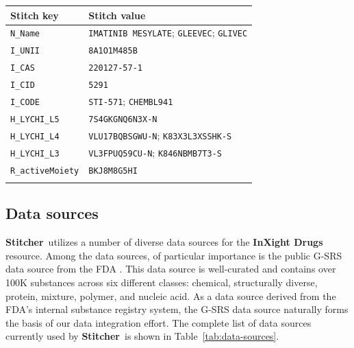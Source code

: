 \documentclass{bioinfo}
\newcommand\st{\textbf{Stitcher}}
\newcommand\ix{\textbf{InXight Drugs}}
\begin{document}
\begin{table}[thb]
{\begin{tabular}{@{}ll@{}}\toprule Stitch key &
Stitch value\\\midrule
\texttt{N\_Name} & \texttt{IMATINIB MESYLATE}; \texttt{GLEEVEC}; \texttt{GLIVEC}\\
\texttt{I\_UNII} & \texttt{8A1O1M485B}\\
\texttt{I\_CAS} & \texttt{220127-57-1}\\
\texttt{I\_CID} & \texttt{5291}\\
\texttt{I\_CODE} & \texttt{STI-571}; \texttt{CHEMBL941}\\
\texttt{H\_LYCHI\_L5} & \texttt{7S4GKGNQ6N3X-N}\\
\texttt{H\_LYCHI\_L4} & \texttt{VLU17BQBSGWU-N}; \texttt{K83X3L3XSSHK-S}\\
\texttt{H\_LYCHI\_L3} & \texttt{VL3FPUQ59CU-N}; \texttt{K846NBMB7T3-S}\\
\texttt{R\_activeMoiety} & \texttt{BKJ8M8G5HI}\\\botrule
\end{tabular}}{}
\end{table}

\subsection{Data sources}
\st\ utilizes a number of diverse data sources for the \ix{} resource.
Among the data sources, of particular importance is the public G-SRS
data source from the FDA \citep{GSRSData}. This data source is
well-curated and contains over 100K substances across six different
classes: chemical, structurally diverse, protein, mixture, polymer,
and nucleic acid. As a data source derived from the FDA's internal
substance registry system, the G-SRS data source naturally forms the
basis of our data integration effort. The complete list of data
sources currently used by \st\ is shown in
Table~\ref{tab:data-sources}. 
\end{document}
